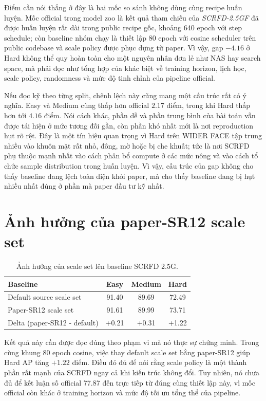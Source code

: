 Điểm cần nói thẳng ở đây là hai mốc so sánh không dùng cùng recipe huấn luyện. Mốc official trong model zoo là kết quả tham chiếu của \textit{SCRFD-2.5GF} đã được huấn luyện rất dài trong public recipe gốc, khoảng 640 epoch với step schedule; còn baseline nhóm chạy là thiết lập 80 epoch với cosine scheduler trên public codebase và scale policy được phục dựng từ paper. Vì vậy, gap \(-4.16\) ở Hard không thể quy hoàn toàn cho một nguyên nhân đơn lẻ như NAS hay search space, mà phải đọc như tổng hợp của khác biệt về training horizon, lịch học, scale policy, randomness và mức độ tinh chỉnh của pipeline official.

Nếu đọc kỹ theo từng split, chênh lệch này cũng mang một cấu trúc rất có ý nghĩa. Easy và Medium cùng thấp hơn official \(2.17\) điểm, trong khi Hard thấp hơn tới \(4.16\) điểm. Nói cách khác, phần dễ và phần trung bình của bài toán vẫn được tái hiện ở mức tương đối gần, còn phần khó nhất mới là nơi reproduction hụt rõ rệt. Đây là một tín hiệu quan trọng vì Hard trên WIDER FACE tập trung nhiều vào khuôn mặt rất nhỏ, đông, mờ hoặc bị che khuất; tức là nơi SCRFD phụ thuộc mạnh nhất vào cách phân bổ compute ở các mức nông và vào cách tổ chức sample distribution trong huấn luyện. Vì vậy, cấu trúc của gap không cho thấy baseline đang lệch toàn diện khỏi paper, mà cho thấy baseline đang bị hụt nhiều nhất đúng ở phần mà paper đầu tư kỹ nhất.

\section{Ảnh hưởng của paper-SR12 scale set}

\begin{table}[H]
\centering
\caption{Ảnh hưởng của scale set lên baseline SCRFD 2.5G.}
\small
\begin{tabular}{@{}lccc@{}}
\toprule
\textbf{Baseline} & \textbf{Easy} & \textbf{Medium} & \textbf{Hard} \\
\midrule
Default source scale set & 91.40 & 89.69 & 72.49 \\
Paper-SR12 scale set & 91.61 & 89.99 & 73.71 \\
\midrule
Delta (paper-SR12 - default) & +0.21 & +0.31 & +1.22 \\
\bottomrule
\end{tabular}
\end{table}

Kết quả này cần được đọc đúng theo phạm vi mà nó thực sự chứng minh. Trong cùng khung 80 epoch cosine, việc thay default scale set bằng paper-SR12 giúp Hard AP tăng \(+1.22\) điểm. Điều đó đủ để nói rằng scale policy là một thành phần rất mạnh của SCRFD ngay cả khi kiến trúc không đổi. Tuy nhiên, nó chưa đủ để kết luận số official 77.87 đến trực tiếp từ đúng cùng thiết lập này, vì mốc official còn khác ở training horizon và mức độ tối ưu tổng thể của pipeline.


